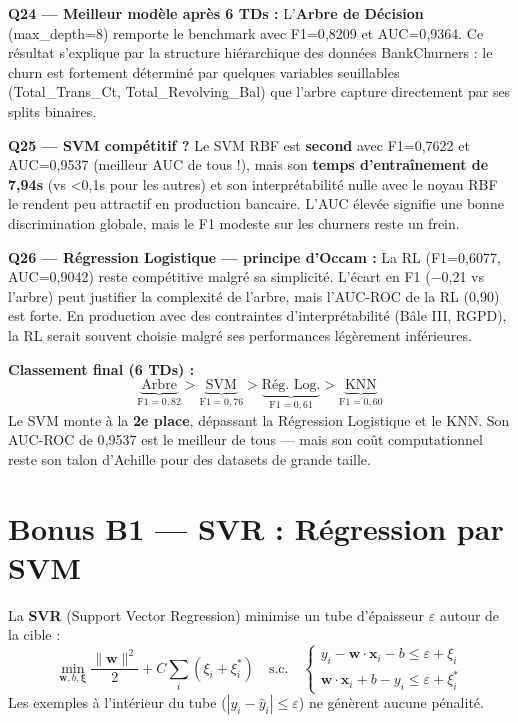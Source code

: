 \documentclass[12pt,a4paper]{article}
\begin{document}
\begin{reponsebox}
\textbf{Q24 — Meilleur modèle après 6 TDs :}
L'\textbf{Arbre de Décision} (max\_depth=8) remporte le benchmark avec F1=0{,}8209 et AUC=0{,}9364. Ce résultat s'explique par la structure hiérarchique des données BankChurners : le churn est fortement déterminé par quelques variables seuillables (Total\_Trans\_Ct, Total\_Revolving\_Bal) que l'arbre capture directement par ses splits binaires.

\textbf{Q25 — SVM compétitif ?}
Le SVM RBF est \textbf{second} avec F1=0{,}7622 et AUC=0{,}9537 (meilleur AUC de tous !), mais son \textbf{temps d'entraînement de 7{,}94s} (vs <0{,}1s pour les autres) et son interprétabilité nulle avec le noyau RBF le rendent peu attractif en production bancaire. L'AUC élevée signifie une bonne discrimination globale, mais le F1 modeste sur les churners reste un frein.

\textbf{Q26 — Régression Logistique — principe d'Occam :}
La RL (F1=0{,}6077, AUC=0{,}9042) reste compétitive malgré sa simplicité. L'écart en F1 (−0{,}21 vs l'arbre) peut justifier la complexité de l'arbre, mais l'AUC-ROC de la RL (0{,}90) est forte. En production avec des contraintes d'interprétabilité (Bâle III, RGPD), la RL serait souvent choisie malgré ses performances légèrement inférieures.
\end{reponsebox}

\begin{observbox}
\textbf{Classement final (6 TDs) :}
\[
\underbrace{\text{Arbre}}_{\text{F1}=0{,}82} > \underbrace{\text{SVM}}_{\text{F1}=0{,}76} > \underbrace{\text{Rég. Log.}}_{\text{F1}=0{,}61} > \underbrace{\text{KNN}}_{\text{F1}=0{,}60}
\]
Le SVM monte à la \textbf{2e place}, dépassant la Régression Logistique et le KNN. Son AUC-ROC de 0{,}9537 est le meilleur de tous — mais son coût computationnel reste son talon d'Achille pour des datasets de grande taille.
\end{observbox}

\section{Bonus B1 — SVR : Régression par SVM}

\begin{theorbox}
La \textbf{SVR} (Support Vector Regression) minimise un tube d'épaisseur $\varepsilon$ autour de la cible :
\[
\min_{\mathbf{w},b,\bm{\xi}} \frac{\|\mathbf{w}\|^2}{2} + C\sum_i(\xi_i + \xi_i^*)
\quad \text{s.c.} \quad
\begin{cases}
y_i - \mathbf{w}\cdot\mathbf{x}_i - b \leq \varepsilon + \xi_i \\
\mathbf{w}\cdot\mathbf{x}_i + b - y_i \leq \varepsilon + \xi_i^*
\end{cases}
\]
Les exemples à l'intérieur du tube ($|y_i - \hat{y}_i| \leq \varepsilon$) ne génèrent aucune pénalité.
\end{theorbox}
\end{document}
